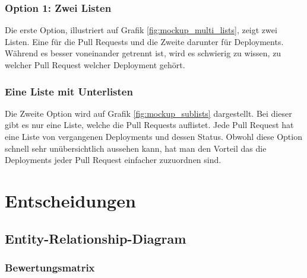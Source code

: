 \subsubsection{Option 1: Zwei Listen}
Die erste Option, illustriert auf Grafik \ref{fig:mockup_multi_lists}, zeigt zwei Listen. Eine für die Pull Requests und
die Zweite darunter für Deployments. \newline
Während es besser voneinander getrennt ist, wird es schwierig zu wissen, zu welcher Pull Request welcher Deployment
gehört. \newline

\subsubsection{Eine Liste mit Unterlisten}
Die Zweite Option wird auf Grafik \ref{fig:mockup_sublists} dargestellt. Bei dieser gibt es nur eine Liste, welche
die Pull Requests auflistet. Jede Pull Request hat eine Liste von vergangenen Deployments und dessen Status. \newline
Obwohl diese Option schnell sehr unübersichtlich aussehen kann, hat man den Vorteil das die Deployments jeder
Pull Request einfacher zuzuordnen sind. \newline

\section{Entscheidungen}
\subsection{Entity-Relationship-Diagram}
\label{sec:decide_erd}
\subsubsection{Bewertungsmatrix}
\begin{center}
\end{center}
